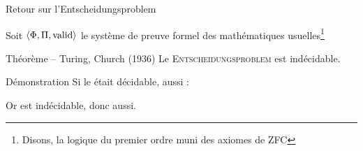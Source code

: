 
\begingroup


\begin{frame}{Retour sur l'Entscheidungsproblem}

  Soit $\langle \Phi, \Pi, \operatorname{valid} \rangle$ le système de preuve formel des mathématiques usuelles\footnote{Disons, la logique du premier ordre muni des axiomes de ZFC}

  
  \begin{block}{Théorème -- Turing, Church (1936)}
    Le \textsc{Entscheidungsproblem} est indécidable. 
  \end{block}

  \pause 
  \begin{block}{Démonstration}
    Si le  était décidable,  aussi :

    \vspace{2mm}
    \begin{algorithm}[H]
    \end{algorithm}
    \vspace{1mm}
    
    Or  est indécidable, donc  aussi. 
  \end{block}
  
\end{frame}

\endgroup
\endinput
